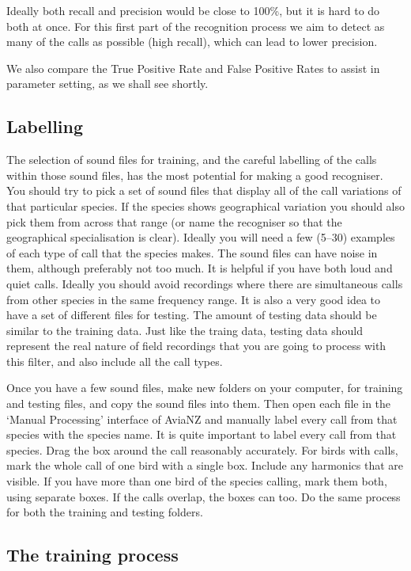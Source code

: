 \documentclass{article}
\begin{document}
Ideally both recall and precision would be close to 100\%, but it is hard to do both at once. For this first part of the recognition process we aim to detect as many of the calls as possible (high recall), which can lead to lower precision. 

We also compare the True Positive Rate and False Positive Rates to assist in parameter setting, as we shall see shortly.

\subsection{Labelling}

The selection of sound files for training, and the careful labelling of the calls within those sound files, has the most potential for making a good recogniser. You should try to pick a set of sound files that display all of the call variations of that particular species. If the species shows geographical variation you should also pick them from across that range (or name the recogniser so that the geographical specialisation is clear).  Ideally you will need a few (5--30) examples of each type of call that the species makes. The sound files can have noise in them, although preferably not too much. It is helpful if you have both loud and quiet calls. Ideally you should avoid recordings where there are simultaneous calls from other species in the same frequency range. It is also a very good idea to have a set of different files for testing. The amount of testing data should be similar to the training data. Just like the traing data, testing data should represent the real nature of field recordings that you are going to process with this filter, and also include all the call types.

Once you have a few sound files, make new folders on your computer, for training and testing files, and copy the sound files into them. Then open each file in the `Manual Processing' interface of AviaNZ and manually label every call from that species with the species name. It is quite important to label every call from that species. Drag the box around the call reasonably accurately. For birds with calls, mark the whole call of one bird with a single box. Include any harmonics that are visible. If you have more than one bird of the species calling, mark them both, using separate boxes. If the calls overlap, the boxes can too. Do the same process for both the training and testing folders.

\subsection{The training process}
\end{document}

